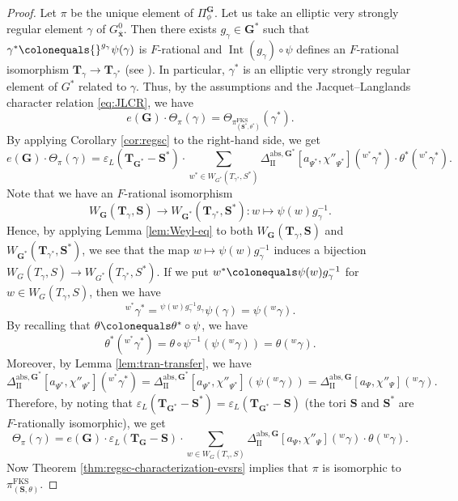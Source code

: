 \documentclass{amsart}
\newcommand{\abs}{\mathrm{abs}}
\newcommand{\FKS}{\mathrm{FKS}}
\newcommand{\bfT}{\mathbf{T}}
\newcommand{\x}{\mathbf{x}}
\newcommand{\bfG}{\mathbf{G}}
\newcommand{\bfS}{\mathbf{S}}
\newcommand{\II}{\mathrm{II}}
\DeclareMathOperator{\Int}{Int}
\theoremstyle{plain}
\theoremstyle{definition}
\theoremstyle{remark}
\theoremstyle{theorem}
\begin{document}
\begin{proof}
Let $\pi$ be the unique element of $\Pi^{\bfG}_{\phi}$.
Let us take an elliptic very strongly regular element $\gamma$ of $G^{0}_{\bar{\x}}$.
Then there exists $g_{\gamma}\in \bfG^{\ast}$ such that $\gamma^{\ast}\colonequals {}^{g_{\gamma}}\psi(\gamma)$ is $F$-rational and $\Int(g_{\gamma})\circ\psi$ defines an $F$-rational isomorphism $\bfT_{\gamma}\rightarrow\bfT_{\gamma^{\ast}}$ (see \cite[Section 3.2]{Kal19}).
In particular, $\gamma^{\ast}$ is an elliptic very strongly regular element of $G^{\ast}$ related to $\gamma$.
Thus, by the assumptions and the Jacquet--Langlands character relation \eqref{eq:JLCR}, we have 
\[
e(\bfG)\cdot\Theta_{\pi}(\gamma)
=
\Theta_{\pi^{\FKS}_{(\bfS^{\ast},\theta^{\ast})}}(\gamma^{\ast}).
\]
By applying Corollary \ref{cor:regsc} to the right-hand side, we get
\[
e(\bfG)\cdot\Theta_{\pi}(\gamma)
=
\varepsilon_{L}(\bfT_{\bfG^{\ast}}-\bfS^{\ast})\cdot
\sum_{w^{\ast}\in W_{G^{\ast}}(T_{\gamma^{\ast}},S^{\ast})}\Delta_{\II}^{\abs,\bfG^{\ast}}[a_{\Psi^{\ast}},\chi''_{\Psi^{\ast}}]({}^{w^{\ast}}\gamma^{\ast})\cdot\theta^{\ast}({}^{w^{\ast}}\gamma^{\ast}).
\]
Note that we have an $F$-rational isomorphism
\[
W_{\bfG}(\bfT_{\gamma},\bfS)
\rightarrow
W_{\bfG^{\ast}}(\bfT_{\gamma^{\ast}},\bfS^{\ast})
\colon w\mapsto \psi(w)g_{\gamma}^{-1}.
\]
Hence, by applying Lemma \ref{lem:Weyl-eq} to both $W_{\bfG}(\bfT_{\gamma},\bfS)$ and $W_{\bfG^{\ast}}(\bfT_{\gamma^{\ast}},\bfS^{\ast})$, we see that the map $w\mapsto \psi(w)g_{\gamma}^{-1}$ induces a bijection $W_{G}(T_{\gamma},S)\rightarrow W_{G^{\ast}}(T_{\gamma^{\ast}},S^{\ast})$.
If we put $w^{\ast}\colonequals \psi(w)g_{\gamma}^{-1}$ for $w\in W_{G}(T_{\gamma},S)$, then we have 
\[
{}^{w^{\ast}}\gamma^{\ast}
={}^{\psi(w)g_{\gamma}^{-1}}{}^{g_{\gamma}}\psi(\gamma)
=\psi({}^{w}\gamma).
\]
By recalling that $\theta\colonequals \theta^{\ast}\circ\psi$, we have
\[
\theta^{\ast}({}^{w^{\ast}}\gamma^{\ast})
=\theta\circ\psi^{-1}(\psi({}^{w}\gamma))
=\theta({}^{w}\gamma).
\]
Moreover, by Lemma \ref{lem:tran-transfer}, we have
\[
\Delta_{\II}^{\abs,\bfG^{\ast}}[a_{\Psi^{\ast}},\chi''_{\Psi^{\ast}}]({}^{w^{\ast}}\gamma^{\ast})
=\Delta_{\II}^{\abs,\bfG^{\ast}}[a_{\Psi^{\ast}},\chi''_{\Psi^{\ast}}](\psi({}^{w}\gamma))
=\Delta_{\II}^{\abs,\bfG}[a_{\Psi},\chi''_{\Psi}]({}^{w}\gamma).
\]
Therefore, by noting that $\varepsilon_{L}(\bfT_{\bfG^{\ast}}-\bfS^{\ast})=\varepsilon_{L}(\bfT_{\bfG^{\ast}}-\bfS)$ (the tori $\bfS$ and $\bfS^{\ast}$ are $F$-rationally isomorphic), we get
\[
\Theta_{\pi}(\gamma)
=
e(\bfG)\cdot\varepsilon_{L}(\bfT_{\bfG}-\bfS)\cdot
\sum_{w\in W_{G}(T_{\gamma},S)}\Delta_{\II}^{\abs,\bfG}[a_{\Psi},\chi''_{\Psi}]({}^{w}\gamma)\cdot\theta({}^{w}\gamma).
\]
Now Theorem \ref{thm:regsc-characterization-evsrs} implies that $\pi$ is isomorphic to $\pi^{\FKS}_{(\bfS,\theta)}$.
\end{proof}
\end{document}
